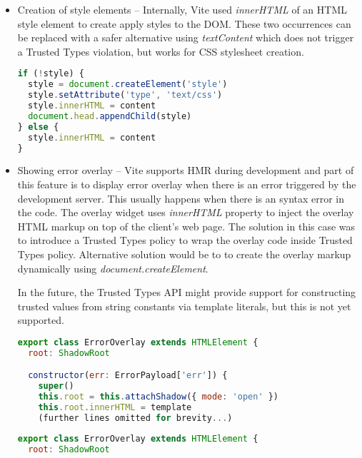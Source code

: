 \begin{itemize}
  \item Creation of style elements -- Internally, Vite used \textit{innerHTML} of an HTML style
        element to create apply styles to the DOM. These two occurrences can be replaced with a
        safer alternative using \textit{textContent} which does not trigger a Trusted Types
        violation, but works for CSS stylesheet creation.

        \bigskip
        \begin{lstlisting}[language=JavaScript, caption=Creation of style elements using innerHTML in Vite \cite{commit_vite_inner_html_styles}]
if (!style) {
  style = document.createElement('style')
  style.setAttribute('type', 'text/css')
  style.innerHTML = content
  document.head.appendChild(style)
} else {
  style.innerHTML = content
}
\end{lstlisting}

  \item Showing error overlay -- Vite supports HMR during development and part of this feature is to
        display error overlay when there is an error triggered by the development server. This
        usually happens when there is an syntax error in the code. The overlay widget uses
        \textit{innerHTML} property to inject the overlay HTML markup on top of the client's web
        page. The solution in this case was to introduce a Trusted Types policy to wrap the overlay
        code inside Trusted Types policy. Alternative solution would be to to create the overlay
        markup dynamically using \textit{document.createElement}.

        In the future, the Trusted Types API might provide support for constructing trusted values
        from string constants via template literals, but this is not yet supported.

        \bigskip
        \begin{lstlisting}[language=JavaScript, caption=Creation of error overlay using innerHTML property \cite{commit_vite_inner_html_overlay}]
export class ErrorOverlay extends HTMLElement {
  root: ShadowRoot

  constructor(err: ErrorPayload['err']) {
    super()
    this.root = this.attachShadow({ mode: 'open' })
    this.root.innerHTML = template
    (further lines omitted for brevity...)
\end{lstlisting}

        \bigskip
        \begin{lstlisting}[language=JavaScript, caption=Creation of error overlay using Trusted Types policy \cite{commit_vite_policy_overlay}]
export class ErrorOverlay extends HTMLElement {
  root: ShadowRoot


\end{lstlisting}
\end{itemize}
